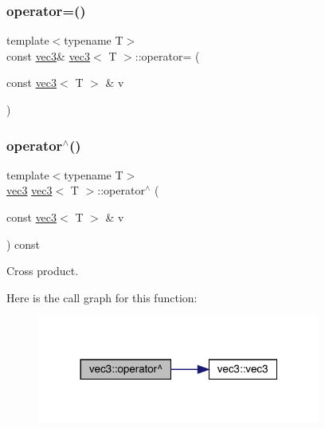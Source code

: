\mbox{\label{structvec3_ad2cd7d64d02aa394c736ccc7054e5411}} 
\subsubsection{\texorpdfstring{operator=()}{operator=()}}
{\footnotesize\ttfamily template$<$typename T$>$ \\
const \mbox{\hyperlink{structvec3}{vec3}}\& \mbox{\hyperlink{structvec3}{vec3}}$<$ T $>$\+::operator= (\begin{DoxyParamCaption}\item[{const \mbox{\hyperlink{structvec3}{vec3}}$<$ T $>$ \&}]{v }\end{DoxyParamCaption})\hspace{0.3cm}{\ttfamily [inline]}}

\mbox{\label{structvec3_a6469fdfd7c378f5f30e299bc2e1e776a}} 
\subsubsection{\texorpdfstring{operator$^\wedge$()}{operator^()}}
{\footnotesize\ttfamily template$<$typename T$>$ \\
\mbox{\hyperlink{structvec3}{vec3}} \mbox{\hyperlink{structvec3}{vec3}}$<$ T $>$\+::operator$^\wedge$ (\begin{DoxyParamCaption}\item[{const \mbox{\hyperlink{structvec3}{vec3}}$<$ T $>$ \&}]{v }\end{DoxyParamCaption}) const\hspace{0.3cm}{\ttfamily [inline]}}



Cross product. 

Here is the call graph for this function\+:\nopagebreak
\begin{figure}[H]
\begin{center}
\leavevmode
\includegraphics[width=264pt]{structvec3_a6469fdfd7c378f5f30e299bc2e1e776a_cgraph}
\end{center}
\end{figure}
\mbox{\label{structvec3_a8539e3e4fbf555f6bd464fdc75fdfd56}} 
